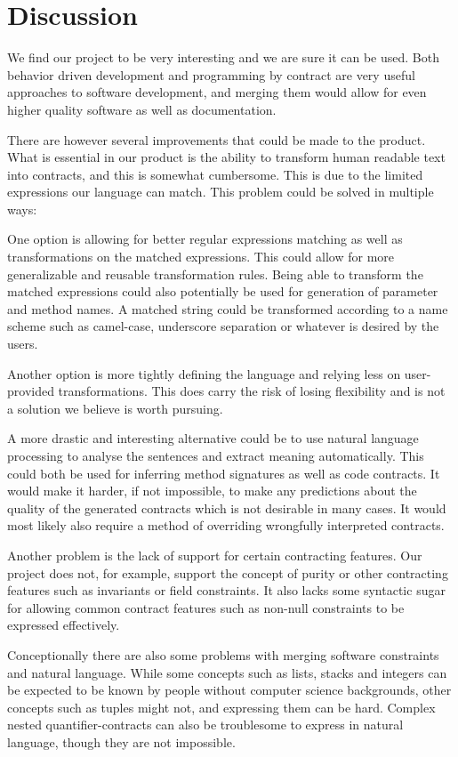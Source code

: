 \section{Discussion}
We find our project to be very interesting and we are sure it can be used.
Both behavior driven development and programming by contract are very useful approaches to software development, and merging them would allow for even higher quality software as well as documentation.

There are however several improvements that could be made to the product.
What is essential in our product is the ability to transform human readable text into contracts, and this is somewhat cumbersome.
This is due to the limited expressions our language can match.
This problem could be solved in multiple ways: 

One option is allowing for better regular expressions matching as well as transformations on the matched expressions.
This could allow for more generalizable and reusable transformation rules.
Being able to transform the matched expressions could also potentially be used for generation of parameter and method names.
A matched string could be transformed according to a name scheme such as camel-case, underscore separation or whatever is desired by the users.

Another option is more tightly defining the language and relying less on user-provided transformations.
This does carry the risk of losing flexibility and is not a solution we believe is worth pursuing.

A more drastic and interesting alternative could be to use natural language processing to analyse the sentences and extract meaning automatically.
This could both be used for inferring method signatures as well as code contracts.
It would make it harder, if not impossible, to make any predictions about the quality of the generated contracts which is not desirable in many cases.
It would most likely also require a method of overriding wrongfully interpreted contracts.

Another problem is the lack of support for certain contracting features.
Our project does not, for example, support the concept of purity or other contracting features such as invariants or field constraints.
It also lacks some syntactic sugar for allowing common contract features such as non-null constraints to be expressed effectively.

Conceptionally there are also some problems with merging software constraints and natural language.
While some concepts such as lists, stacks and integers can be expected to be known by people without computer science backgrounds, other concepts such as tuples might not, and expressing them can be hard.
Complex nested quantifier-contracts can also be troublesome to express in natural language, though they are not impossible.

